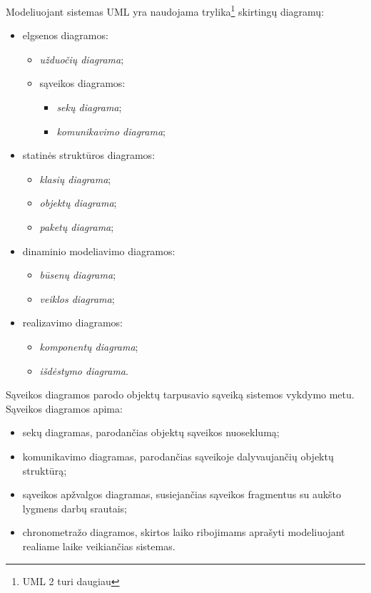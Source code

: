 Modeliuojant sistemas UML yra naudojama trylika\footnote{UML 2 turi 
daugiau} skirtingų diagramų:
\begin{itemize}
  \item elgsenos diagramos:
    \begin{itemize}
      \item \emph{užduočių diagrama};
      \item sąveikos diagramos:
        \begin{itemize}
          \item \emph{sekų diagrama};
          \item \emph{komunikavimo diagrama};
        \end{itemize}
    \end{itemize}
  \item statinės struktūros diagramos:
    \begin{itemize}
      \item \emph{klasių diagrama};
      \item \emph{objektų diagrama};
      \item \emph{paketų diagrama};
    \end{itemize}
  \item dinaminio modeliavimo diagramos:
    \begin{itemize}
      \item \emph{būsenų diagrama};
      \item \emph{veiklos diagrama};
    \end{itemize}
  \item realizavimo diagramos:
    \begin{itemize}
      \item \emph{komponentų diagrama};
      \item \emph{išdėstymo diagrama}.
    \end{itemize}
\end{itemize}

Sąveikos diagramos parodo objektų tarpusavio sąveiką sistemos vykdymo
metu. Sąveikos diagramos apima:
\begin{itemize}
  \item sekų diagramas, parodančias objektų sąveikos nuoseklumą;
  \item komunikavimo diagramas, parodančias sąveikoje dalyvaujančių objektų
    struktūrą;
  \item sąveikos apžvalgos diagramas, susiejančias sąveikos fragmentus su
    aukšto lygmens darbų srautais;
  \item chronometražo  diagramos, skirtos laiko ribojimams
    aprašyti modeliuojant realiame laike veikiančias sistemas.
\end{itemize}

